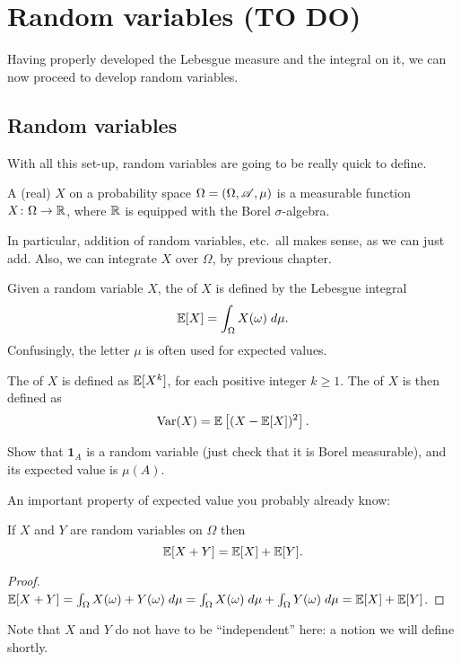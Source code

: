 \chapter{Random variables (TO DO)}
\label{ch:random_variables}
Having properly developed the Lebesgue measure
and the integral on it,
we can now proceed to develop random variables.

\section{Random variables}
With all this set-up, random variables are going to be really quick to define.
\begin{definition}
	A (real)  $X$ on a probability space
	$\Omega = (\Omega, \mathscr A, \mu)$
	is a measurable function $X \colon \Omega \to \mathbb R$,
	where $\mathbb R$ is equipped with the Borel $\sigma$-algebra.
\end{definition}
In particular, addition of random variables, etc.\
all makes sense, as we can just add.
Also, we can integrate $X$ over $\Omega$, by previous chapter.

\begin{definition}
	Given a random variable $X$,
	the  of $X$ is defined by
	the Lebesgue integral
	\[ \mathbb E[X] = \int_{\Omega} X(\omega) \; d\mu. \]
	Confusingly, the letter $\mu$ is often used for expected values.

	The  of $X$ is defined as $\mathbb E[X^k]$,
	for each positive integer $k \ge 1$.
	The  of $X$ is then defined as
	\[ \operatorname{Var}(X) = \mathbb E\left[ (X-\mathbb E[X])^2 \right]. \]
\end{definition}
\begin{ques}
	Show that $\mathbf{1}_A$ is a random variable
	(just check that it is Borel measurable),
	and its expected value is $\mu(A)$.
\end{ques}

An important property of expected value you probably already know:
\begin{theorem}
	If $X$ and $Y$ are random variables on $\Omega$ then
	\[ \mathbb E[X+Y] = \mathbb E[X] + \mathbb E[Y]. \]
\end{theorem}
\begin{proof}
	$\mathbb E[X+Y] = \int_\Omega X(\omega) + Y(\omega) \; d\mu
	= \int_\Omega X(\omega) \; d\mu + \int_\Omega Y(\omega) \; d\mu
	= \mathbb E[X] + \mathbb E[Y]$.
\end{proof}
Note that $X$ and $Y$ do not have to be ``independent'' here:
a notion we will define shortly.

